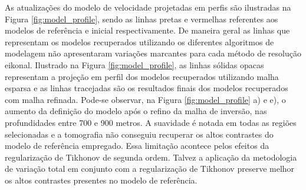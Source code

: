 As atualizações do modelo de velocidade projetadas em perfis são ilustradas na Figura \ref{fig:model_profile}, sendo as linhas pretas e vermelhas referentes aos modelos de referência e inicial respectivamente. De maneira geral as linhas que representam os modelos recuperados utilizando os diferentes algoritmos de modelagem não apresentaram variações marcantes para cada método de resolução eikonal. Ilustrado na Figura \ref{fig:model_profile}, as linhas sólidas opacas representam a projeção em perfil dos modelos recuperados utilizando malha esparsa e as linhas tracejadas são os resultados finais dos modelos recuperados com malha refinada. Pode-se observar, na Figura \ref{fig:model_profile} a) e e), o aumento da definição do modelo após o refino da malha de inversão, nas profundidades entre 700 e 900 metros. A suavidade é notada em todas as regiões selecionadas e a tomografia não conseguiu recuperar os altos contrastes do modelo de referência empregado. Essa limitação acontece pelos efeitos da regularização de Tikhonov de segunda ordem. Talvez a aplicação da metodologia de variação total em conjunto com a regularização de Tikhonov \cite{jiang20183d} preserve melhor os altos contrastes presentes no modelo de referência. 

